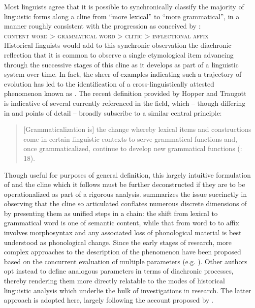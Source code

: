 \documentclass[output=paper]{langsci/langscibook}
\begin{document}
Most linguists agree that it is possible to synchronically classify the majority of linguistic forms along a cline from “more lexical” to “more grammatical”, in a manner roughly consistent with the progression as conceived by \citet{HopperTraugott2003}:\\

\textsc{content} \textsc{word} > \textsc{grammatical} \textsc{word} > \textsc{clitic} > \textsc{inflectional} \textsc{affix}\\

Historical linguists would add to this synchronic observation the diachronic reflection that it is common to observe a single etymological item advancing through the successive stages of this cline as it develops as part of a linguistic system over time. In fact, the sheer  of examples indicating such a trajectory of evolution has led to the identification of a cross-linguistically attested phenomenon known as . The recent definition provided by Hopper and Traugott is indicative of several currently referenced in the field, which – though differing in  and points of detail – broadly subscribe to a similar central principle:

\begin{quote}
[Grammaticalization is] the change whereby lexical items and constructions come in certain linguistic contexts to serve grammatical functions and, once grammaticalized, continue to develop new grammatical functions (\citealt{HopperTraugott2003}: 18).
\end{quote}

Though useful for purposes of general definition, this largely intuitive formulation of  and the cline which it follows must be further deconstructed if they are to be operationalized as part of a rigorous analysis. \citet{Andersen2008} summarizes the issue succinctly in observing that the  cline so articulated conflates numerous discrete dimensions of  by presenting them as unified steps in a chain: the shift from lexical to grammatical word is one of semantic content, while that from word to  to affix involves morphosyntax and any associated loss of phonological material is best understood as phonological change. Since the early stages of  research, more complex approaches to the description of the phenomenon have been proposed based on the concurrent evaluation of multiple parameters (e.g. \citealt{Lehmann1985}). Other authors opt instead to define analogous parameters in terms of diachronic processes, thereby rendering them more directly relatable to the modes of historical linguistic analysis which underlie the bulk of investigations in  research. The latter approach is adopted here, largely following the account proposed by \citet{Heine2007}. 
\end{document}

